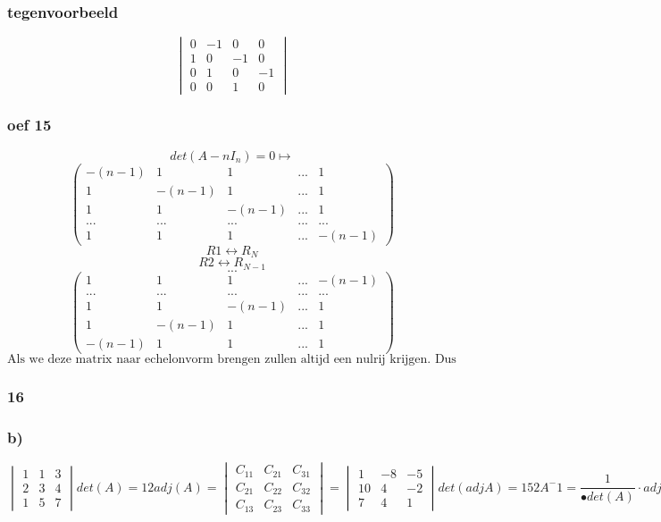 \documentclass[10pt,a4paper]{article}
\begin{document}
\subsubsection*{tegenvoorbeeld}
\[
\begin{vmatrix}
0 & -1 & 0 & 0\\
1 & 0 & -1 & 0\\
0 & 1 & 0 & -1\\
0 & 0 & 1 & 0
\end{vmatrix}
\]
\subsubsection*{oef 15}
\[ det(A-nI_{n})=0 \longmapsto \]
\[
\begin{pmatrix}
-(n-1) & 1 & 1 &... & 1\\
1 & -(n-1) & 1 & ... & 1\\
1 & 1 & -(n-1) & ... & 1\\
... & ... & ... & ... & ...\\
1 & 1 & 1 & ... & -(n-1)
\end{pmatrix} 
\]
\[R1 \leftrightarrow R_{N} \]
\[R2 \leftrightarrow R_{N-1} \]
\[...\]
\[
\begin{pmatrix}
1 & 1 & 1 & ... & -(n-1)\\
... & ... & ... & ... & ...\\
1 & 1 & -(n-1) & ... & 1\\
1 & -(n-1) & 1 & ... & 1\\
-(n-1) & 1 & 1 &... & 1
\end{pmatrix} 
\]
\[ \text{Als we deze matrix naar echelonvorm brengen zullen altijd een nulrij krijgen. Dus det=0}\]

\subsubsection*{16}
\subsubsection*{b)}
\[
\begin{vmatrix}
1 & 1 & 3\\
2 & 3 & 4\\
1 & 5 & 7
\end{vmatrix}
det(A) = 12
adj(A) =
\begin{vmatrix}
C_{11} & C_{21} & C_{31}\\
C_{21} & C_{22} & C_{32}\\
C_{13} & C_{23} & C_{33}
\end{vmatrix}
= 
\begin{vmatrix}
1 & -8 & -5\\
10 & 4 & -2\\
7 & 4 & 1
\end{vmatrix}
det(adj A) = 152
A^-1 = \frac{1}{•det(A)} \cdot adj(A)
	 = \frac{1}{12} \cdot \begin{vmatrix}
	 						1 & -8	-5\\
	 						10 & 4 & -2\\
	 						7 & 4 & 1
	 					  \end{vmatrix}
\]
\end{document}
